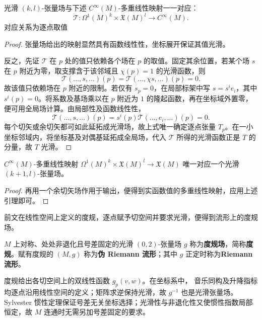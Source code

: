 \begin{theorem}[张量场特征引理]
    光滑 $(k,l)$-张量场与下述 $C^\infty(M)$-多重线性映射一一对应：
    \[
        \mathscr T:\Omega^1(M)^k\times\mathfrak X(M)^l\to C^\infty(M).
    \]
    对应关系为逐点取值
\end{theorem}
\begin{proof}
    张量场给出的映射显然具有函数线性性，坐标展开保证其值光滑。

    反之，先证 $\mathscr T$ 在 $p$ 处的值只依赖各个场在 $p$ 的取值。固定其余位置，若某个场 $s$ 在 $p$ 附近为零，取支撑含于该邻域且 $\chi(p)=1$ 的光滑函数，则
    \[
        \mathscr T(\ldots,s,\ldots)(p)
        =\mathscr T(\ldots,\chi s,\ldots)(p)=0.
    \]
    故该值只依赖场在 $p$ 附近的限制。若仅有 $s_p=0$，在局部标架中写 $s=s^i e_i$，其中 $s^i(p)=0$。将系数及基场乘以在 $p$ 附近为 $1$ 的隆起函数，再在坐标域外置零，便可用全局场计算。由局部性及函数线性性，
    \[
        \mathscr T(\ldots,s,\ldots)(p)
        =s^i(p)\mathscr T(\ldots,e_i,\ldots)(p)=0.
    \]
    每个切矢或余切矢都可如此延拓成光滑场，故上式唯一确定逐点张量 $T_p$。在一小坐标邻域内，将坐标基及对偶基延拓成全局场，代入 $\mathscr T$ 所得的光滑函数正是 $T$ 的分量，故 $T$ 光滑。
\end{proof}

\begin{corollary}
    $C^\infty(M)$-多重线性映射 $\Omega^1(M)^k\times\mathfrak X(M)^l\to\mathfrak X(M)$ 唯一对应一个光滑 $(k+1,l)$-张量场。
\end{corollary}
\begin{proof}
    再用一个余切矢场作用于输出，便得到实函数值的多重线性映射，应用上述引理即可。
\end{proof}

前文在线性空间上定义的度规，逐点赋予切空间并要求光滑，便得到流形上的度规场。

\begin{definition}\label{def:metric-field}
    $M$ 上对称、处处非退化且号差固定的光滑 $(0,2)$-张量场 $g$ 称为\textbf{度规场}，简称\textbf{度规}。赋有度规的 $(M,g)$ 称为\textbf{伪 Riemann 流形}；其中 $g$ 正定时称为\textbf{Riemann 流形}。
\end{definition}

度规给出各切空间上的双线性函数 $g_p(v,w)$。在坐标系中，
音乐同构及升降指标均逐点沿用线性空间的定义；矩阵求逆保持光滑，故 $g^{-1}$ 也是光滑张量场。Sylvester 惯性定理保证号差无关坐标选择；光滑性与非退化性又使惯性指数局部恒定，故 $M$ 连通时无需另加号差固定的要求。

